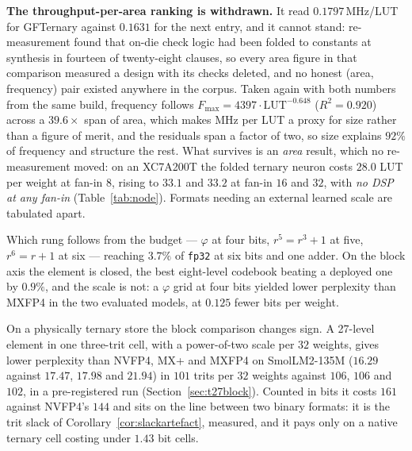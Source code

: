 \textbf{The throughput-per-area ranking is withdrawn.} It read
$0.1797$\,MHz/LUT for GFTernary against $0.1631$ for the next entry, and it
cannot stand: re-measurement found that on-die check logic had been folded to
constants at synthesis in fourteen of twenty-eight clauses, so every area figure
in that comparison measured a design with its checks deleted, and no honest
(area, frequency) pair existed anywhere in the corpus. Taken again with both
numbers from the same build, frequency follows
$F_{\max}=4397\cdot\mathrm{LUT}^{-0.648}$ ($R^2=0.920$) across a
$39.6\times$ span of area, which makes MHz per LUT a proxy for size rather than a
figure of merit, and the residuals span a factor of two, so size explains $92\%$
of frequency and structure the rest. What survives is an \emph{area} result,
which no re-measurement moved: on an XC7A200T the folded ternary neuron costs
$28.0$ LUT per weight at fan-in $8$, rising to $33.1$ and $33.2$ at fan-in $16$
and $32$, with \emph{no DSP at any fan-in} (Table~\ref{tab:node}). Formats
needing an external learned scale are tabulated apart.

Which rung follows from the budget --- $\varphi$ at four bits, $r^5{=}r^3{+}1$ at
five, $r^6{=}r{+}1$ at six --- reaching $3.7\%$ of \texttt{fp32} at six bits and
one adder. On the block axis the element is closed, the best eight-level
codebook beating a deployed one by $0.9\%$, and the scale is not: a $\varphi$
grid at four bits yielded lower perplexity than MXFP4 in the two evaluated models,
at $0.125$ fewer bits per weight.

On a physically ternary store the block comparison changes sign. A 27-level
element in one three-trit cell, with a power-of-two scale per $32$ weights,
gives lower perplexity than NVFP4, MX+ and MXFP4 on SmolLM2-135M ($16.29$
against $17.47$, $17.98$ and $21.94$) in $101$ trits per $32$ weights against
$106$, $106$ and $102$, in a pre-registered run (Section~\ref{sec:t27block}).
Counted in bits it costs $161$ against NVFP4's $144$ and sits on the line
between two binary formats: it is the trit slack of
Corollary~\ref{cor:slackartefact}, measured, and it pays only on a native
ternary cell costing under $1.43$ bit cells.

